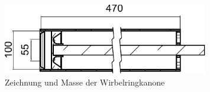 \begin{figure}
\centering
\includegraphics[width=0.8\textwidth]{papers/wirbelringe/fig/zeichnung.pdf}
\caption{Zeichnung und Masse der Wirbelringkanone \cite{Wirbelringe:3D_modelle} \label{buch:papers:Wirbelringe:fig:zeichnung}}
\end{figure}